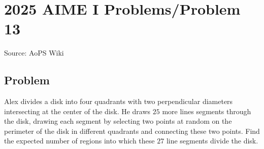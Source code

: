 \documentclass[12pt]{article}
\begin{document}
\section*{{2025 AIME I Problems/Problem 13}}
Source: AoPS Wiki

\subsection*{Problem}
Alex divides a disk into four quadrants with two perpendicular diameters intersecting at the center of the disk. He draws $25$ more lines segments through the disk, drawing each segment by selecting two points at random on the perimeter of the disk in different quadrants and connecting these two points. Find the expected number of regions into which these $27$ line segments divide the disk.
\end{document}
